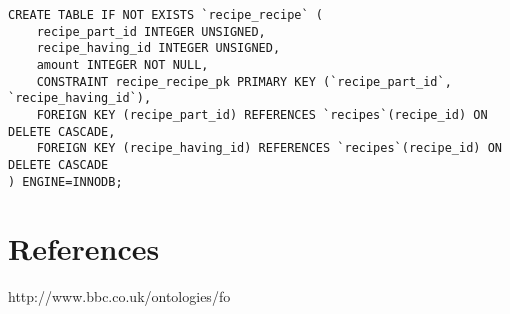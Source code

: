 \documentclass{article}
\begin{document}
\begin{lstlisting}[caption=Script of database]
CREATE TABLE IF NOT EXISTS `recipe_recipe` (
    recipe_part_id INTEGER UNSIGNED,
    recipe_having_id INTEGER UNSIGNED,
    amount INTEGER NOT NULL,
    CONSTRAINT recipe_recipe_pk PRIMARY KEY (`recipe_part_id`, `recipe_having_id`),
    FOREIGN KEY (recipe_part_id) REFERENCES `recipes`(recipe_id) ON DELETE CASCADE,
    FOREIGN KEY (recipe_having_id) REFERENCES `recipes`(recipe_id) ON DELETE CASCADE
) ENGINE=INNODB;

\end{lstlisting}
\section*{References}
http://www.bbc.co.uk/ontologies/fo
\end{document}
